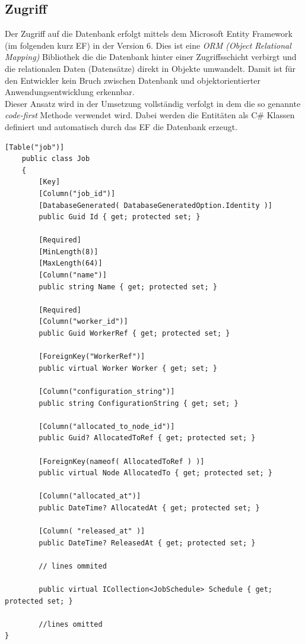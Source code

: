 \subsection{Zugriff}
Der Zugriff auf die Datenbank erfolgt mittels dem Microsoft Entity Framework (im folgenden kurz EF) in der Version 6. Dies ist eine \emph{ORM (Object Relational Mapping)} Bibliothek die die Datenbank hinter einer Zugriffsschicht verbirgt und die relationalen Daten (Datensätze) direkt in Objekte umwandelt. Damit ist für den Entwickler kein Bruch zwischen Datenbank und objektorientierter Anwendungsentwicklung erkennbar.
\\Dieser Ansatz wird in der Umsetzung vollständig verfolgt in dem die so genannte \emph{code-first} Methode verwendet wird. Dabei
werden die Entitäten als C\# Klassen definiert und automatisch durch das EF die Datenbank erzeugt. 
\begin{lstlisting}[caption={Klassendefinition für Code-First, siehe Job.cs}, label={lst:codefirst}, captionpos=b]
    [Table("job")]
	public class Job
	{
		[Key]
		[Column("job_id")]
		[DatabaseGenerated( DatabaseGeneratedOption.Identity )]
		public Guid Id { get; protected set; }

		[Required]
		[MinLength(8)]
		[MaxLength(64)]
		[Column("name")]
		public string Name { get; protected set; }

		[Required]
		[Column("worker_id")]
		public Guid WorkerRef { get; protected set; }

		[ForeignKey("WorkerRef")]
		public virtual Worker Worker { get; set; }

		[Column("configuration_string")]
		public string ConfigurationString { get; set; }

		[Column("allocated_to_node_id")]
		public Guid? AllocatedToRef { get; protected set; }

		[ForeignKey(nameof( AllocatedToRef ) )]
		public virtual Node AllocatedTo { get; protected set; }

		[Column("allocated_at")]
		public DateTime? AllocatedAt { get; protected set; }

		[Column( "released_at" )]
		public DateTime? ReleasedAt { get; protected set; }
		
		// lines ommited
		
		public virtual ICollection<JobSchedule> Schedule { get; protected set; }
		
		//lines omitted
}
\end{lstlisting}
